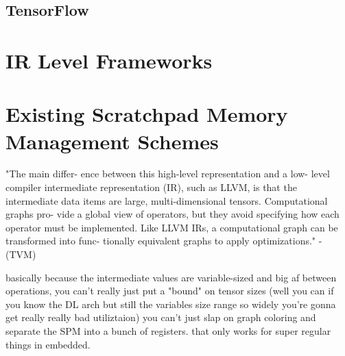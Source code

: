 
\subsection{TensorFlow}


\section{IR Level Frameworks}



\section{Existing Scratchpad Memory Management Schemes}
"The main differ- ence between this high-level representation and a low- level
compiler intermediate representation (IR), such as LLVM, is that the
intermediate data items are large, multi-dimensional tensors. Computational
graphs pro- vide a global view of operators, but they avoid specifying how each
operator must be implemented. Like LLVM IRs, a computational graph can be
transformed into func- tionally equivalent graphs to apply optimizations." - (TVM)

basically because the intermediate values are variable-sized and big af between operations,
you can't really just put a "bound" on tensor sizes (well you can if you know the DL arch but still the
variables size range so widely you're gonna get really really bad utiliztaion) you can't just slap on
graph coloring and separate the SPM into a bunch of registers. that only works for super regular things
in embedded.


